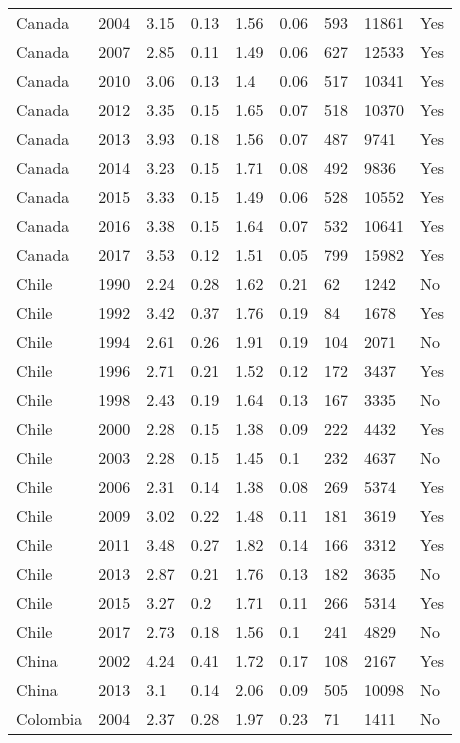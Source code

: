 \begin{tabular}{lllllllll}
Canada & 2004 & 3.15 & 0.13 & 1.56 & 0.06 & 593 & 11861 & Yes \\ 
Canada & 2007 & 2.85 & 0.11 & 1.49 & 0.06 & 627 & 12533 & Yes \\ 
Canada & 2010 & 3.06 & 0.13 & 1.4 & 0.06 & 517 & 10341 & Yes \\ 
Canada & 2012 & 3.35 & 0.15 & 1.65 & 0.07 & 518 & 10370 & Yes \\ 
Canada & 2013 & 3.93 & 0.18 & 1.56 & 0.07 & 487 & 9741 & Yes \\ 
Canada & 2014 & 3.23 & 0.15 & 1.71 & 0.08 & 492 & 9836 & Yes \\ 
Canada & 2015 & 3.33 & 0.15 & 1.49 & 0.06 & 528 & 10552 & Yes \\ 
Canada & 2016 & 3.38 & 0.15 & 1.64 & 0.07 & 532 & 10641 & Yes \\ 
Canada & 2017 & 3.53 & 0.12 & 1.51 & 0.05 & 799 & 15982 & Yes \\ 
Chile & 1990 & 2.24 & 0.28 & 1.62 & 0.21 & 62 & 1242 & No \\ 
Chile & 1992 & 3.42 & 0.37 & 1.76 & 0.19 & 84 & 1678 & Yes \\ 
Chile & 1994 & 2.61 & 0.26 & 1.91 & 0.19 & 104 & 2071 & No \\ 
Chile & 1996 & 2.71 & 0.21 & 1.52 & 0.12 & 172 & 3437 & Yes \\ 
Chile & 1998 & 2.43 & 0.19 & 1.64 & 0.13 & 167 & 3335 & No \\ 
Chile & 2000 & 2.28 & 0.15 & 1.38 & 0.09 & 222 & 4432 & Yes \\ 
Chile & 2003 & 2.28 & 0.15 & 1.45 & 0.1 & 232 & 4637 & No \\ 
Chile & 2006 & 2.31 & 0.14 & 1.38 & 0.08 & 269 & 5374 & Yes \\ 
Chile & 2009 & 3.02 & 0.22 & 1.48 & 0.11 & 181 & 3619 & Yes \\ 
Chile & 2011 & 3.48 & 0.27 & 1.82 & 0.14 & 166 & 3312 & Yes \\ 
Chile & 2013 & 2.87 & 0.21 & 1.76 & 0.13 & 182 & 3635 & No \\ 
Chile & 2015 & 3.27 & 0.2 & 1.71 & 0.11 & 266 & 5314 & Yes \\ 
Chile & 2017 & 2.73 & 0.18 & 1.56 & 0.1 & 241 & 4829 & No \\ 
China & 2002 & 4.24 & 0.41 & 1.72 & 0.17 & 108 & 2167 & Yes \\ 
China & 2013 & 3.1 & 0.14 & 2.06 & 0.09 & 505 & 10098 & No \\ 
Colombia & 2004 & 2.37 & 0.28 & 1.97 & 0.23 & 71 & 1411 & No \\ 

\end{tabular}

